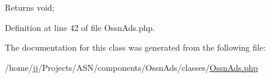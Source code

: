 \begin{DoxyReturn}{Returns}
void; 
\end{DoxyReturn}


Definition at line 42 of file Ossn\+Ads.\+php.



The documentation for this class was generated from the following file\+:\begin{DoxyCompactItemize}
\item 
/home/jj/\+Projects/\+A\+S\+N/components/\+Ossn\+Ads/classes/\hyperlink{_ossn_ads_8php}{Ossn\+Ads.\+php}\end{DoxyCompactItemize}
